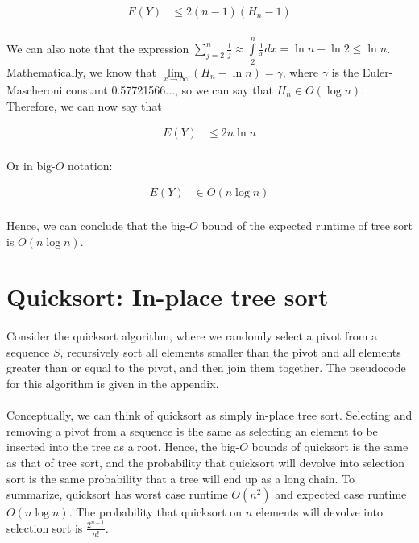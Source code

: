 \documentclass{article}
\begin{document}
\begin{align*}
E(Y) &\leq 2 (n - 1) (H_n - 1)
\end{align*}

\paragraph{} We can also note that the expression $\sum\limits_{j = 2}^{n} \frac{1}{j} \approx \int\limits_2^n \frac{1}{x} dx = \ln n - \ln 2 \leq \ln n $. Mathematically, we know that $\lim\limits_{x \to \infty} (H_n - \ln n) = \gamma$, where $\gamma$ is the Euler-Mascheroni constant 0.57721566..., so we can say that $H_n \in O(\log n)$. Therefore, we can now say that

\begin{align*}
E(Y) &\leq 2 n \ln n
\end{align*}

\paragraph{} Or in big-$O$ notation:

\begin{align*}
E(Y) &\in O(n \log n)
\end{align*}

\paragraph{} Hence, we can conclude that the big-$O$ bound of the expected runtime of tree sort is $O(n \log n)$.

\section{Quicksort: In-place tree sort}

\paragraph{} Consider the quicksort algorithm, where we randomly select a pivot from a sequence $S$, recursively sort all elements smaller than the pivot and all elements greater than or equal to the pivot, and then join them together. The pseudocode for this algorithm is given in the appendix.

\paragraph{} Conceptually, we can think of quicksort as simply in-place tree sort. Selecting and removing a pivot from a sequence is the same as selecting an element to be inserted into the tree as a root. Hence, the big-$O$ bounds of quicksort is the same as that of tree sort, and the probability that quicksort will devolve into selection sort is the same probability that a tree will end up as a long chain. To summarize, quicksort has worst case runtime $O(n^2)$ and expected case runtime $O(n \log n)$. The probability that quicksort on $n$ elements will devolve into selection sort is $\frac{2^{n-1}}{n!}$.
\end{document}
